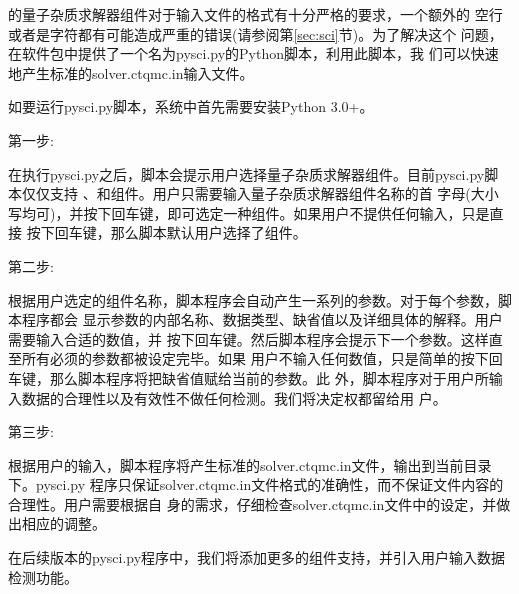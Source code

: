 {\iqist}的量子杂质求解器组件对于输入文件的格式有十分严格的要求，一个额外的
空行或者是字符都有可能造成严重的错误(请参阅第\ref{sec:sci}节)。为了解决这个
问题，在{\iqist}软件包中提供了一个名为pysci.py的Python脚本，利用此脚本，我
们可以快速地产生标准的solver.ctqmc.in输入文件。

如要运行pysci.py脚本，系统中首先需要安装Python 3.0+。

第一步:

在执行pysci.py之后，脚本会提示用户选择量子杂质求解器组件。目前pysci.py脚本仅仅支持
{\azalea}、{\gardenia}和{\narcissus}组件。用户只需要输入量子杂质求解器组件名称的首
字母(大小写均可)，并按下回车键，即可选定一种组件。如果用户不提供任何输入，只是直接
按下回车键，那么脚本默认用户选择了{\azalea}组件。

第二步:

根据用户选定的组件名称，脚本程序会自动产生一系列的参数。对于每个参数，脚本程序都会
显示参数的内部名称、数据类型、缺省值以及详细具体的解释。用户需要输入合适的数值，并
按下回车键。然后脚本程序会提示下一个参数。这样直至所有必须的参数都被设定完毕。如果
用户不输入任何数值，只是简单的按下回车键，那么脚本程序将把缺省值赋给当前的参数。此
外，脚本程序对于用户所输入数据的合理性以及有效性不做任何检测。我们将决定权都留给用
户。

第三步:

根据用户的输入，脚本程序将产生标准的solver.ctqmc.in文件，输出到当前目录下。pysci.py
程序只保证solver.ctqmc.in文件格式的准确性，而不保证文件内容的合理性。用户需要根据自
身的需求，仔细检查solver.ctqmc.in文件中的设定，并做出相应的调整。

在后续版本的pysci.py程序中，我们将添加更多的组件支持，并引入用户输入数据检测功能。
